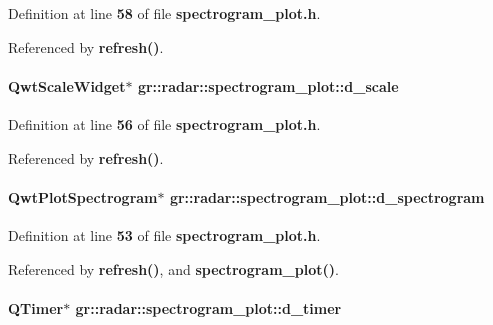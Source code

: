 Definition at line {\bf 58} of file {\bf spectrogram\+\_\+plot.\+h}.



Referenced by {\bf refresh()}.

\paragraph[{d\+\_\+scale}]{\setlength{\rightskip}{0pt plus 5cm}Qwt\+Scale\+Widget$\ast$ gr\+::radar\+::spectrogram\+\_\+plot\+::d\+\_\+scale\hspace{0.3cm}{\ttfamily [private]}}\label{classgr_1_1radar_1_1spectrogram__plot_a33047f9e81bfff6788f169803f33a7f8}


Definition at line {\bf 56} of file {\bf spectrogram\+\_\+plot.\+h}.



Referenced by {\bf refresh()}.

\paragraph[{d\+\_\+spectrogram}]{\setlength{\rightskip}{0pt plus 5cm}Qwt\+Plot\+Spectrogram$\ast$ gr\+::radar\+::spectrogram\+\_\+plot\+::d\+\_\+spectrogram\hspace{0.3cm}{\ttfamily [private]}}\label{classgr_1_1radar_1_1spectrogram__plot_afc7a0085b89060cade07488ac9cd1585}


Definition at line {\bf 53} of file {\bf spectrogram\+\_\+plot.\+h}.



Referenced by {\bf refresh()}, and {\bf spectrogram\+\_\+plot()}.

\paragraph[{d\+\_\+timer}]{\setlength{\rightskip}{0pt plus 5cm}Q\+Timer$\ast$ gr\+::radar\+::spectrogram\+\_\+plot\+::d\+\_\+timer\hspace{0.3cm}{\ttfamily [private]}}\label{classgr_1_1radar_1_1spectrogram__plot_a1974516b85dc66f29a2760b20a8e8fa4}


